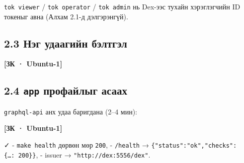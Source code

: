 \texttt{tok\ viewer} / \texttt{tok\ operator} / \texttt{tok\ admin} нь Dex-ээс тухайн хэрэглэгчийн ID токеныг авна (Алхам 2.1-д дэлгэрэнгүй).

\hypertarget{ux43dux44dux433-ux443ux434ux430ux430ux433ux438ux439ux43d-ux431ux44dux43bux442ux433ux44dux43b}{%
\subsection{2.3 Нэг удаагийн бэлтгэл}\label{ux43dux44dux433-ux443ux434ux430ux430ux433ux438ux439ux43d-ux431ux44dux43bux442ux433ux44dux43b}}

\textbf{{[}ЗК · Ubuntu-1{]}}

\begin{Shaded}
\begin{Highlighting}[]
\end{Highlighting}
\end{Shaded}

\hypertarget{app-ux43fux440ux43eux444ux430ux439ux43bux44bux433-ux430ux441ux430ux430ux445}{%
\subsection{\texorpdfstring{2.4 \texttt{app} профайлыг асаах}{2.4 app профайлыг асаах}}\label{app-ux43fux440ux43eux444ux430ux439ux43bux44bux433-ux430ux441ux430ux430ux445}}

\texttt{graphql-api} анх удаа баригдана (2--4 мин):

\textbf{{[}ЗК · Ubuntu-1{]}}

\begin{Shaded}
\begin{Highlighting}[]
\KeywordTok{|} 
\KeywordTok{|} 
\end{Highlighting}
\end{Shaded}

✓
- \texttt{make\ health} дөрвөн мөр \texttt{200},
- \texttt{/health} → \texttt{\{"status":\allowbreak{}"ok","checks":\allowbreak{}\{\ldots{}:\allowbreak{}\ 200\}\}},
- issuer → \texttt{"http:\allowbreak{}/\allowbreak{}/\allowbreak{}dex:\allowbreak{}5556/\allowbreak{}dex"}.

